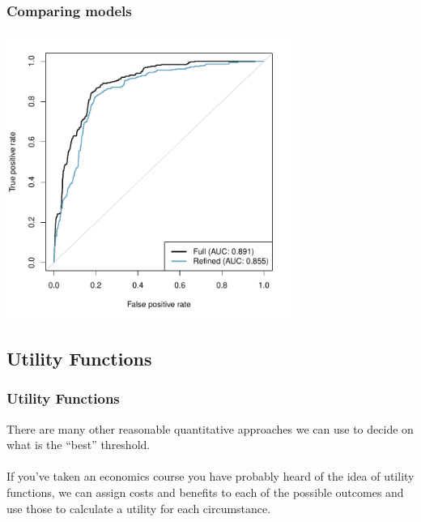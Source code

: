 \begin{frame}[fragile]
\frametitle{Comparing models}

\vspace{-8mm}

\begin{center}
\includegraphics[width=0.7\textwidth]{9-5_logistic_reg/figures/spam/ROC_comp.pdf}
\end{center}

\end{frame}


\subsection{Utility Functions}


\begin{frame}
\frametitle{Utility Functions}

There are many other reasonable quantitative approaches we can use to decide on what is the ``best'' threshold.\\
~\\
If you've taken an economics course you have probably heard of the idea of utility functions, we can assign costs and benefits to each of the possible  outcomes and use those to calculate a utility for each circumstance.

\end{frame}


